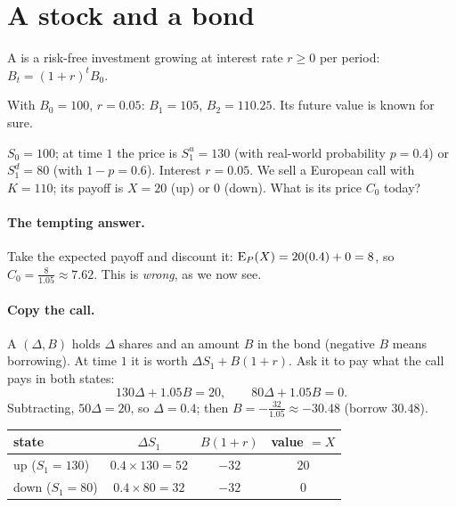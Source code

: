 \section{A stock and a bond}

\begin{definition}[Bond]
A  is a risk-free investment growing at interest rate $r\ge0$ per period: $B_t=(1+r)^tB_0$.
\end{definition}

With $B_0=100$, $r=0.05$: $B_1=105$, $B_2=110.25$. Its future value is known for sure.

\begin{setup}
$S_0=100$; at time $1$ the price is $S_1^u=130$ (with real-world probability $p=0.4$) or $S_1^d=80$ (with $1-p=0.6$). Interest $r=0.05$. We sell a European call with $K=110$; its payoff is $X=20$ (up) or $0$ (down). What is its price $C_0$ today?
\end{setup}

\paragraph{The tempting answer.} Take the expected payoff and discount it: $\operatorname{E}_P(X)=20(0.4)+0=8$, so $C_0=\frac{8}{1.05}\approx7.62$. This is \emph{wrong}, as we now see.

\paragraph{Copy the call.} A  $(\Delta,B)$ holds $\Delta$ shares and an amount $B$ in the bond (negative $B$ means borrowing). At time $1$ it is worth $\Delta S_1+B(1+r)$. Ask it to pay what the call pays in both states:
\[
  130\Delta+1.05B=20,\qquad 80\Delta+1.05B=0 .
\]
Subtracting, $50\Delta=20$, so $\Delta=0.4$; then $B=-\frac{32}{1.05}\approx-30.48$ (borrow $30.48$).

\begin{center}
\renewcommand{\arraystretch}{1.25}
\begin{tabular}{@{}lccc@{}}
\toprule
state & $\Delta S_1$ & $B(1+r)$ & value $=X$ \\
\midrule
up ($S_1=130$) & $0.4\times130=52$ & $-32$ & $20$ \\
down ($S_1=80$) & $0.4\times80=32$ & $-32$ & $0$ \\
\bottomrule
\end{tabular}
\end{center}

